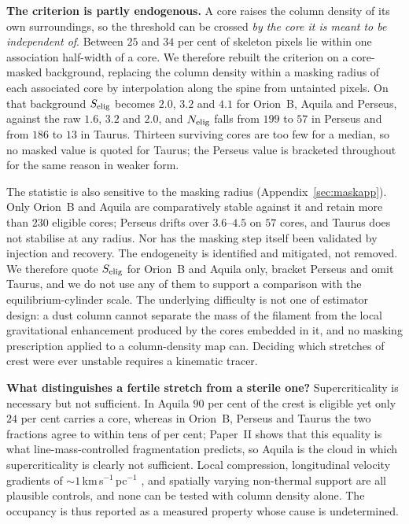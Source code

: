 \documentclass[usenatbib,twoside,twocolumn]{mnras}
\begin{document}
\smallskip\noindent\textbf{The criterion is partly endogenous.} A core raises the column density of its own surroundings, so the threshold can be crossed \emph{by the core it is meant to be independent of}. Between $25$ and $34$ per cent of skeleton pixels lie within one association half-width of a core. We therefore rebuilt the criterion on a core-masked background, replacing the column density within a masking radius of each associated core by interpolation along the spine from untainted pixels. On that background $S_{\rm elig}$ becomes $2.0$, $3.2$ and $4.1$ for Orion~B, Aquila and Perseus, against the raw $1.6$, $3.2$ and $2.0$, and $N_{\rm elig}$ falls from $199$ to $57$ in Perseus and from $186$ to $13$ in Taurus. Thirteen surviving cores are too few for a median, so no masked value is quoted for Taurus; the Perseus value is bracketed throughout for the same reason in weaker form.

The statistic is also sensitive to the masking radius (Appendix~\ref{sec:maskapp}). Only Orion~B and Aquila are comparatively stable against it and retain more than $230$ eligible cores; Perseus drifts over $3.6$--$4.5$ on $57$ cores, and Taurus does not stabilise at any radius. Nor has the masking step itself been validated by injection and recovery. The endogeneity is identified and mitigated, not removed. We therefore quote $S_{\rm elig}$ for Orion~B and Aquila only, bracket Perseus and omit Taurus, and we do not use any of them to support a comparison with the equilibrium-cylinder scale. The underlying difficulty is not one of estimator design: a dust column cannot separate the mass of the filament from the local gravitational enhancement produced by the cores embedded in it, and no masking prescription applied to a column-density map can. Deciding which stretches of crest were ever unstable requires a kinematic tracer.

\smallskip\noindent\textbf{What distinguishes a fertile stretch from a sterile one?} Supercriticality is necessary but not sufficient. In Aquila $90$ per cent of the crest is eligible yet only $24$ per cent carries a core, whereas in Orion~B, Perseus and Taurus the two fractions agree to within tens of per cent; Paper~II shows that this equality is what line-mass-controlled fragmentation predicts, so Aquila is the cloud in which supercriticality is clearly not sufficient. Local compression, longitudinal velocity gradients of $\sim1$\,km\,s$^{-1}$\,pc$^{-1}$ \citep{Kirk2013,Hacar2013}, and spatially varying non-thermal support are all plausible controls, and none can be tested with column density alone. The occupancy is thus reported as a measured property whose cause is undetermined.
\end{document}
